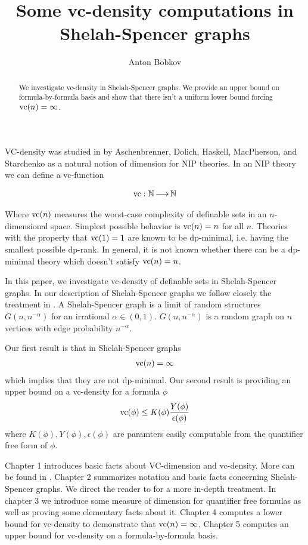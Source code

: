 \documentclass{amsart}
\title{Some vc-density computations in Shelah-Spencer graphs}
\author{Anton Bobkov}
\begin{document}
\begin{abstract}
  We investigate vc-density in Shelah-Spencer graphs.
  We provide an upper bound on formula-by-formula basis and show that there isn't a uniform lower bound forcing $\operatorname{vc}(n) = \infty$.
\end{abstract}

\maketitle


VC-density was studied in \cite{density} by Aschenbrenner, Dolich, Haskell, MacPherson, and Starchenko as a natural notion of dimension for NIP theories. In an NIP theory we can define a vc-function

\begin{align*}
	\operatorname{vc} : \mathbb{N} \operatorname{\longrightarrow} \mathbb{N}
\end{align*}

Where $\operatorname{vc}(n)$ measures the worst-case complexity of definable sets in an $n$-dimensional space. Simplest possible behavior is $\operatorname{vc}(n) = n$ for all $n$. Theories with the property that $\operatorname{vc}(1) = 1$ are known to be dp-minimal, i.e. having the smallest possible dp-rank. In general, it is not known whether there can be a dp-minimal theory which doesn't satisfy $\operatorname{vc}(n)=n$.

In this paper, we investigate vc-density of definable sets in Shelah-Spencer graphs.
In our description of Shelah-Spencer graphs we follow closely the treatment in \cite{laskowski}.
A Shelah-Spencer graph is a limit of random structures $G(n, n^{-\alpha})$ for an irrational $\alpha \in (0,1)$.
$G(n, n^{-\alpha})$ is a random graph on $n$ vertices with edge probability $n^{-\alpha}$.

Our first result is that in Shelah-Spencer graphs
\begin{align*}
    \operatorname{vc}(n) = \infty
\end{align*}
which implies that they are not dp-minimal.
Our second result is providing an upper bound on a vc-density for a formula $\phi$
\begin{align*}
    \operatorname{vc}(\phi) \leq K(\phi) \frac{Y(\phi)}{\epsilon(\phi)}    
\end{align*}
where $K(\phi), Y(\phi), \epsilon(\phi)$ are paramters easily computable from the quantifier free form of $\phi$.

Chapter 1 introduces basic facts about VC-dimension and vc-density.
More can be found in \cite{density}.
Chapter 2 summarizes notation and basic facts concerning Shelah-Spencer graphs.
We direct the reader to \cite{laskowski} for a more in-depth treatment.
In chapter 3 we introduce some measure of dimension for quantifier free formulas as well as proving some elementary facts about it.
Chapter 4 computes a lower bound for vc-density to demonstrate that $\operatorname{vc}(n) = \infty$.
Chapter 5 computes an upper bound for vc-density on a formula-by-formula basis.
\end{document}
